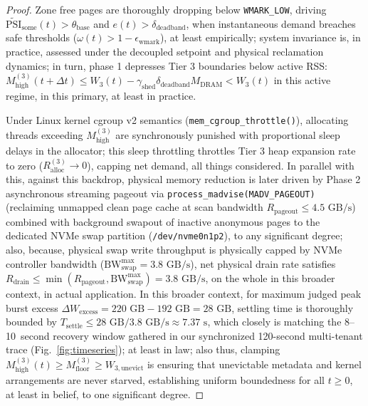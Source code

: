 \documentclass[pdflatex,sn-mathphys,Numbered]{sn-jnl}
\begin{document}
\begin{proof}
Zone free pages are thoroughly dropping below \texttt{WMARK\_LOW}, driving $\tilde{\text{PSI}}_{\text{some}}(t) > \theta_{\text{base}}$ and $e(t) > \delta_{\text{deadband}}$, when instantaneous demand breaches safe thresholds ($\omega(t) > 1 - \epsilon_{\text{wmark}}$), at least empirically; system invariance is, in practice, assessed under the decoupled setpoint and physical reclamation dynamics; in turn, phase 1 depresses Tier 3 boundaries below active RSS: $M_{\text{high}}^{(3)}(t + \Delta t) \le W_3(t) - \gamma_{\text{shed}} \delta_{\text{deadband}} M_{\text{DRAM}} < W_3(t)$ in this active regime, in this primary, at least in practice.

Under Linux kernel cgroup v2 semantics (\texttt{mem\_cgroup\_throttle()}), allocating threads exceeding $M_{\text{high}}^{(3)}$ are synchronously punished with proportional sleep delays in the allocator; this sleep throttling throttles Tier 3 heap expansion rate to zero ($R_{\text{alloc}}^{(3)} \to 0$), capping net demand, all things considered. In parallel with this, against this backdrop, physical memory reduction is later driven by Phase 2 asynchronous streaming pageout via \texttt{process\_madvise(MADV\_PAGEOUT)} (reclaiming unmapped clean page cache at scan bandwidth $R_{\text{pageout}} \le 4.5\text{ GB/s}$) combined with background swapout of inactive anonymous pages to the dedicated NVMe swap partition (\texttt{/dev/nvme0n1p2}), to any significant degree; also, because, physical swap write throughput is physically capped by NVMe controller bandwidth ($\text{BW}_{\text{swap}}^{\text{max}} = 3.8\text{ GB/s}$), net physical drain rate satisfies $R_{\text{drain}} \le \min(R_{\text{pageout}}, \text{BW}_{\text{swap}}^{\text{max}}) = 3.8\text{ GB/s}$, on the whole in this broader context, in actual application. In this broader context, for maximum judged peak burst excess $\Delta W_{\text{excess}} = 220\text{ GB} - 192\text{ GB} = 28\text{ GB}$, settling time is thoroughly bounded by $T_{\text{settle}} \le 28\text{ GB} / 3.8\text{ GB/s} \approx 7.37\text{ s}$, which closely is matching the 8--10~second recovery window gathered in our synchronized 120-second multi-tenant trace (Fig.~\ref{fig:timeseries}); at least in law; also thus, clamping $M_{\text{high}}^{(3)}(t) \ge M_{\text{floor}}^{(3)} \ge W_{3,\text{unevict}}$ is ensuring that unevictable metadata and kernel arrangements are never starved, establishing uniform boundedness for all $t \ge 0$, at least in belief, to one significant degree.


\end{proof}
\end{document}

